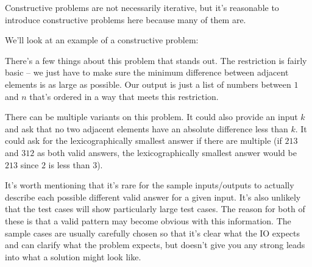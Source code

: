 Constructive problems are not necessarily iterative, but it's reasonable to introduce constructive problems here because many of them are.

We'll look at an example of a constructive problem:

\hrulefill



\hrulefill

There's a few things about this problem that stands out. The restriction is fairly basic -- we just have to make sure the minimum difference between adjacent elements is as large as possible. Our output is just a list of numbers between $1$ and $n$ that's ordered in a way that meets this restriction.

There can be multiple variants on this problem. It could also provide an input $k$ and ask that no two adjacent elements have an absolute difference less than $k$. It could ask for the lexicographically smallest answer if there are multiple (if $2 1 3$ and $3 1 2$ as both valid answers, the lexicographically smallest answer would be $2 1 3$ since $2$ is less than $3$).

It's worth mentioning that it's rare for the sample inputs/outputs to actually describe each possible different valid answer for a given input. It's also unlikely that the test cases will show particularly large test cases. The reason for both of these is that a valid pattern may become obvious with this information. The sample cases are usually carefully chosen so that it's clear what the IO expects and can clarify what the problem expects, but doesn't give you any strong leads into what a solution might look like.
